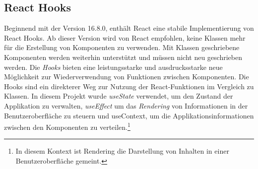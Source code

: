 \subsection{React Hooks}
Beginnend mit der Version 16.8.0, enthält React eine stabile Implementierung von React Hooks. Ab dieser Version wird von React empfohlen, keine Klassen mehr für die Erstellung von Komponenten zu verwenden\cite{R01}. Mit Klassen geschriebene Komponenten werden weiterhin unterstützt und müssen nicht neu geschrieben werden{\cite{R05}}. Die \textit{Hooks} bieten eine leistungsstarke und ausdrucksstarke neue Möglichkeit zur Wiederverwendung von Funktionen zwischen Komponenten. Die Hooks sind ein direkterer Weg zur Nutzung der React-Funktionen im Vergleich zu Klassen. In diesem Projekt wurde \textit{useState} verwendet, um den Zustand der Applikation zu verwalten, \textit{useEffect} um das \textit{Rendering} von Informationen in der Benutzeroberfläche zu steuern und useContext, um die Applikationsinformationen zwischen den Komponenten zu verteilen.\footnote{In diesem Kontext ist Rendering die Darstellung von Inhalten in einer Benutzeroberfläche gemeint.}

